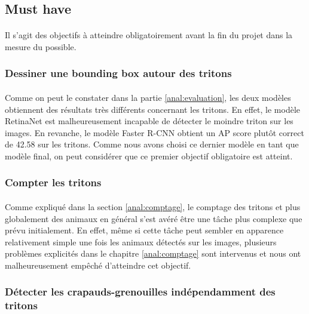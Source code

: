 \subsection{Must have}
\paragraph{} Il s'agit des objectifs à atteindre obligatoirement avant la fin du projet dans la mesure du possible.

\subsubsection{Dessiner une bounding box autour des tritons}
\paragraph{} Comme on peut le constater dans la partie \ref{anal:evaluation}, les deux modèles obtiennent des résultats très différents concernant les tritons. En effet, le modèle RetinaNet est malheureusement incapable de détecter le moindre triton sur les images. En revanche, le modèle Faster R-CNN obtient un AP score plutôt correct de 42.58 sur les tritons. Comme nous avons choisi ce dernier modèle en tant que modèle final, on peut considérer que ce premier objectif obligatoire est atteint.

\subsubsection{Compter les tritons}\label{anal:tritons}
\paragraph{} Comme expliqué dans la section \ref{anal:comptage}, le comptage des tritons et plus globalement des animaux en général s'est avéré être une tâche plus complexe que prévu initialement. En effet, même si cette tâche peut sembler en apparence relativement simple une fois les animaux détectés sur les images, plusieurs problèmes explicités dans le chapitre \ref{anal:comptage} sont intervenus et nous ont malheureusement empêché d'atteindre cet objectif.

\subsubsection{Détecter les crapauds-grenouilles indépendamment des tritons}
